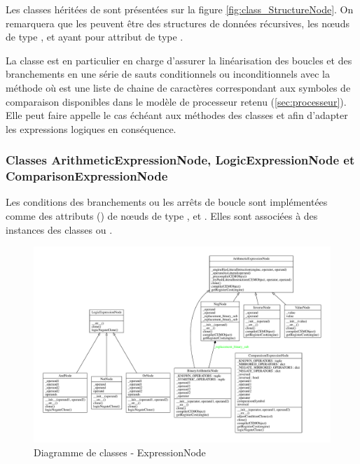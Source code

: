 Les classes héritées de  sont présentées sur la figure \ref{fig:class_StructureNode}. On remarquera que les  peuvent être des structures de données récursives, les n\oe uds de type ,  et  ayant pour attribut  de type .

La classe  est en particulier en charge d'assurer la linéarisation des boucles  et des branchements  en une série de sauts conditionnels ou inconditionnels
avec la méthode  où  est une liste de chaine de caractères correspondant aux symboles de comparaison disponibles dans le modèle de processeur retenu (\ref{sec:processeur}). Elle peut faire appelle le cas échéant aux méthodes des classes  et  afin d'adapter les expressions logiques en conséquence.

\clearpage

\subsubsection{Classes ArithmeticExpressionNode, LogicExpressionNode et ComparisonExpressionNode}

Les conditions des branchements  ou les arrêts de boucle  sont implémentées comme des attributs () de n\oe uds de type ,  et . Elles sont associées à des instances des classes  ou .

\begin{figure}[h!]
	\centering
	\includegraphics[width=\textwidth]{./Pictures/ExpressionNode.pdf}
	\caption{\label{fig:class_ExpressionNode}Diagramme de classes - ExpressionNode}
\end{figure}

